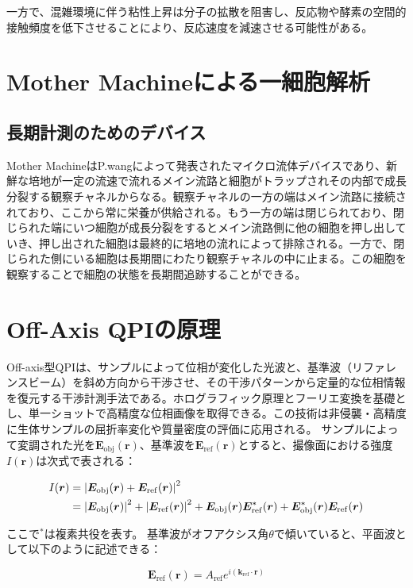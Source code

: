 一方で、混雑環境に伴う粘性上昇は分子の拡散を阻害し、反応物や酵素の空間的接触頻度を低下させることにより、反応速度を減速させる可能性がある。
\section{Mother Machineによる一細胞解析}
\subsection{長期計測のためのデバイス}
Mother MachineはP.wangによって発表されたマイクロ流体デバイスであり、新鮮な培地が一定の流速で流れるメイン流路と細胞がトラップされその内部で成長分裂する観察チャネルからなる。観察チャネルの一方の端はメイン流路に接続されており、ここから常に栄養が供給される。もう一方の端は閉じられており、閉じられた端にいつ細胞が成長分裂をするとメイン流路側に他の細胞を押し出していき、押し出された細胞は最終的に培地の流れによって排除される。一方で、閉じられた側にいる細胞は長期間にわたり観察チャネルの中に止まる。この細胞を観察することで細胞の状態を長期間追跡することができる。
\section{Off-Axis QPIの原理}
Off-axis型QPIは、サンプルによって位相が変化した光波と、基準波（リファレンスビーム）を斜め方向から干渉させ、その干渉パターンから定量的な位相情報を復元する干渉計測手法である。ホログラフィック原理とフーリエ変換を基礎とし、単一ショットで高精度な位相画像を取得できる。この技術は非侵襲・高精度に生体サンプルの屈折率変化や質量密度の評価に応用される。
サンプルによって変調された光を$\bm{E}_{\mathrm{obj}}(\bm{r})$、基準波を$\bm{E}_{\mathrm{ref}}(\bm{r})$とすると、撮像面における強度$I(\bm{r})$は次式で表される：

\begin{align}
I(\bm{r}) &= \abs{\bm{E}_{\mathrm{obj}}(\bm{r}) + \bm{E}_{\mathrm{ref}}(\bm{r})}^2 \\
&= \abs{\bm{E}_{\mathrm{obj}}(\bm{r})}^2 + \abs{\bm{E}_{\mathrm{ref}}(\bm{r})}^2 + \bm{E}_{\mathrm{obj}}(\bm{r}) \bm{E}_{\mathrm{ref}}^*(\bm{r}) + \bm{E}_{\mathrm{obj}}^*(\bm{r}) \bm{E}_{\mathrm{ref}}(\bm{r})
\end{align}

ここで$^*$は複素共役を表す。
基準波がオフアクシス角$\theta$で傾いていると、平面波として以下のように記述できる：

\begin{equation}
\bm{E}_{\mathrm{ref}}(\bm{r}) = A_{\mathrm{ref}} e^{i (\bm{k}_{\mathrm{ref}} \cdot \bm{r})}
\end{equation}


